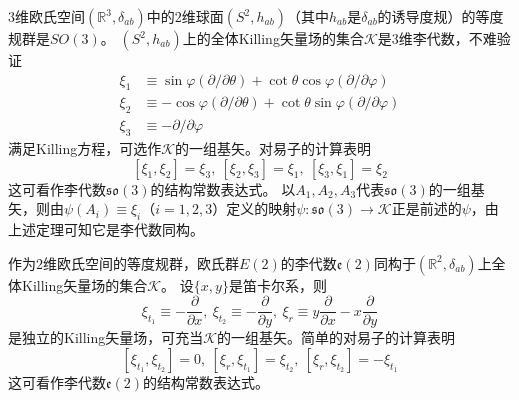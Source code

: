 \begin{example}
    $3$维欧氏空间$(\mathbb{R}^3, \delta_{ab})$中的$2$维球面$(S^2, h_{ab})$（其中$h_{ab}$是$\delta_{ab}$的诱导度规）的等度规群是$SO(3)$。
    $(S^2, h_{ab})$上的全体Killing矢量场的集合$\mathscr{K}$是$3$维李代数，不难验证
    \[\begin{split}
        \xi_1 & \equiv \sin\varphi(\partial / \partial\theta) + \cot\theta\cos\varphi(\partial / \partial\varphi) \\
        \xi_2 & \equiv -\cos\varphi(\partial / \partial\theta) + \cot\theta\sin\varphi(\partial / \partial\varphi) \\
        \xi_3 & \equiv -\partial / \partial\varphi
    \end{split}\]
    满足Killing方程，可选作$\mathscr{K}$的一组基矢。对易子的计算表明
    $$[\xi_1, \xi_2] = \xi_3, ~ [\xi_2, \xi_3] = \xi_1, ~ [\xi_3, \xi_1] = \xi_2$$
    这可看作李代数$\mathfrak{so}(3)$的结构常数表达式。
    以$A_1, A_2, A_3$代表$\mathfrak{so}(3)$的一组基矢，则由$\psi(A_i) \equiv \xi_i$（$i = 1, 2, 3$）定义的映射$\psi \colon \mathfrak{so}(3) \to \mathscr{K}$正是前述的$\psi$，由上述定理可知它是李代数同构。
\end{example}

\begin{example}
    作为$2$维欧氏空间的等度规群，欧氏群$E(2)$的李代数$\mathfrak{e}(2)$同构于$(\mathbb{R}^2, \delta_{ab})$上全体Killing矢量场的集合$\mathscr{K}$。
    设$\{x, y\}$是笛卡尔系，则
    $$\xi_{t_1} \equiv -\frac{\partial}{\partial x}, ~ \xi_{t_2} \equiv -\frac{\partial}{\partial y}, ~ \xi_r \equiv y\frac{\partial}{\partial x} - x\frac{\partial}{\partial y}$$
    是独立的Killing矢量场，可充当$\mathscr{K}$的一组基矢。简单的对易子的计算表明
    $$[\xi_{t_1}, \xi_{t_2}] = 0, ~ [\xi_r, \xi_{t_1}] = \xi_{t_2}, ~ [\xi_r, \xi_{t_2}] = -\xi_{t_1}$$
    这可看作李代数$\mathfrak{e}(2)$的结构常数表达式。
\end{example}

